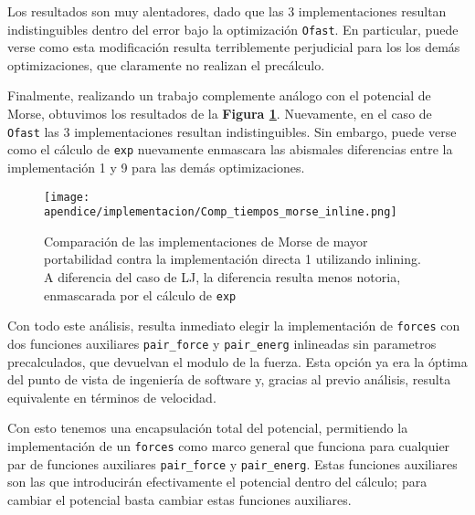Los resultados son muy alentadores, dado que las 3 implementaciones resultan indistinguibles dentro del error bajo la optimización \texttt{Ofast}. 
En particular, puede verse como esta modificación resulta terriblemente perjudicial para los los demás optimizaciones, que claramente no realizan el precálculo. 

Finalmente, realizando un trabajo complemente análogo con el potencial de Morse, obtuvimos los resultados de la \textbf{Figura \ref{fig:CompEsp_morse_inline}}. 
Nuevamente, en el caso de \texttt{Ofast} las 3 implementaciones resultan indistinguibles. 
Sin embargo, puede verse como el cálculo de \texttt{exp} nuevamente enmascara las abismales diferencias entre la implementación 1 y 9 para las demás optimizaciones.

\begin{figure}[h]
	\centering
	\texttt{[image: apendice/implementacion/Comp\_tiempos\_morse\_inline.png]}
	\caption{Comparación de las implementaciones de Morse de mayor portabilidad contra la implementación directa 1 utilizando inlining. A diferencia del caso de LJ, la diferencia resulta menos notoria, 
	enmascarada por el cálculo de \texttt{exp}}
	\label{fig:CompEsp_morse_inline}
\end{figure}

Con todo este análisis, resulta inmediato elegir la implementación de \texttt{forces} con dos funciones auxiliares \texttt{pair\_force} y \texttt{pair\_energ} inlineadas sin parametros precalculados, 
que devuelvan el modulo de la fuerza. Esta opción ya era la óptima del punto de vista de ingeniería de software y, gracias al previo análisis, resulta equivalente en términos de velocidad.

Con esto tenemos una encapsulación total del potencial, permitiendo la implementación de un \texttt{forces} como marco general que funciona para cualquier par de funciones auxiliares \texttt{pair\_force} y 
\texttt{pair\_energ}. 
Estas funciones auxiliares son las que introducirán efectivamente el potencial dentro del cálculo; para cambiar el potencial basta cambiar estas funciones auxiliares.


